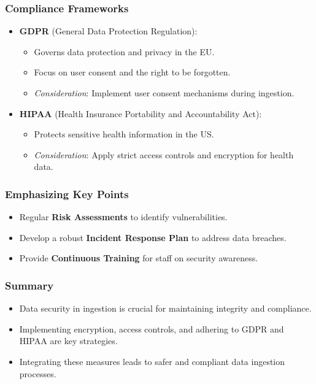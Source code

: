 \documentclass{beamer}
\begin{document}
\begin{frame}[fragile]
    \frametitle{Compliance Frameworks}
    \begin{itemize}
        \item \textbf{GDPR} (General Data Protection Regulation):
        \begin{itemize}
            \item Governs data protection and privacy in the EU.
            \item Focus on user consent and the right to be forgotten.
            \item \textit{Consideration}: Implement user consent mechanisms during ingestion.
        \end{itemize}
        \item \textbf{HIPAA} (Health Insurance Portability and Accountability Act):
        \begin{itemize}
            \item Protects sensitive health information in the US.
            \item \textit{Consideration}: Apply strict access controls and encryption for health data.
        \end{itemize}
    \end{itemize}
\end{frame}

\begin{frame}[fragile]
    \frametitle{Emphasizing Key Points}
    \begin{itemize}
        \item Regular \textbf{Risk Assessments} to identify vulnerabilities.
        \item Develop a robust \textbf{Incident Response Plan} to address data breaches.
        \item Provide \textbf{Continuous Training} for staff on security awareness.
    \end{itemize}
\end{frame}

\begin{frame}[fragile]
    \frametitle{Summary}
    \begin{itemize}
        \item Data security in ingestion is crucial for maintaining integrity and compliance.
        \item Implementing encryption, access controls, and adhering to GDPR and HIPAA are key strategies.
        \item Integrating these measures leads to safer and compliant data ingestion processes.
    \end{itemize}
\end{frame}
\end{document}
